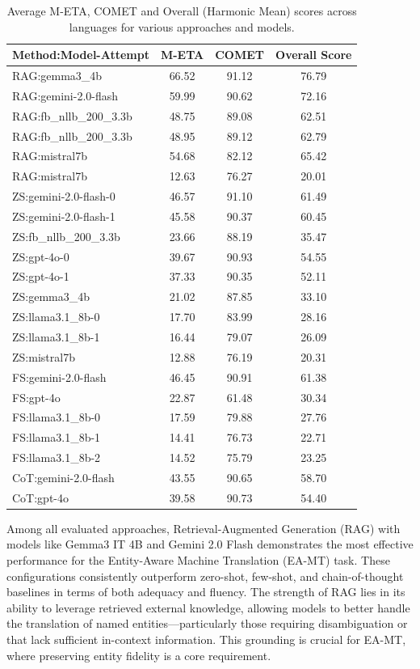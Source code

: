 \documentclass{ecai}
\begin{document}
\begin{table}[h!]
\centering
\small %
\label{tab:combined_methods_avg_scores}
\begin{tabular}{|l|c|c|c|}
\hline
\textbf{Method:Model-Attempt} & \textbf{M-ETA} & \textbf{COMET} & \textbf{Overall Score} \\
\hline
RAG:gemma3\_4b & 66.52 & 91.12 & 76.79 \\
RAG:gemini-2.0-flash & 59.99 & 90.62 & 72.16 \\
RAG:fb\_nllb\_200\_3.3b & 48.75 & 89.08 & 62.51 \\
RAG:fb\_nllb\_200\_3.3b & 48.95 & 89.12 & 62.79 \\
RAG:mistral7b & 54.68 & 82.12 & 65.42 \\
RAG:mistral7b & 12.63 & 76.27 & 20.01 \\
\hline
ZS:gemini-2.0-flash-0 & 46.57 & 91.10 & 61.49 \\
ZS:gemini-2.0-flash-1 & 45.58 & 90.37 & 60.45 \\
ZS:fb\_nllb\_200\_3.3b & 23.66 & 88.19 & 35.47 \\
ZS:gpt-4o-0 & 39.67 & 90.93 & 54.55 \\
ZS:gpt-4o-1 & 37.33 & 90.35 & 52.11 \\
ZS:gemma3\_4b & 21.02 & 87.85 & 33.10 \\
ZS:llama3.1\_8b-0 & 17.70 & 83.99 & 28.16 \\
ZS:llama3.1\_8b-1 & 16.44 & 79.07 & 26.09 \\
ZS:mistral7b & 12.88 & 76.19 & 20.31 \\
\hline
FS:gemini-2.0-flash & 46.45 & 90.91 & 61.38 \\
FS:gpt-4o & 22.87 & 61.48 & 30.34 \\
FS:llama3.1\_8b-0 & 17.59 & 79.88 & 27.76 \\
FS:llama3.1\_8b-1 & 14.41 & 76.73 & 22.71 \\
FS:llama3.1\_8b-2 & 14.52 & 75.79 & 23.25 \\
\hline
CoT:gemini-2.0-flash & 43.55 & 90.65 & 58.70 \\
CoT:gpt-4o & 39.58 & 90.73 & 54.40 \\
\hline
\end{tabular}
\caption{Average M-ETA, COMET and Overall (Harmonic Mean) scores across languages for various approaches and models.}
\end{table}

Among all evaluated approaches, Retrieval-Augmented Generation (RAG) with models like Gemma3 IT 4B 
and Gemini 2.0 Flash demonstrates the most effective performance for the Entity-Aware Machine Translation (EA-MT) task. 
These configurations consistently outperform zero-shot, few-shot, and chain-of-thought baselines in terms of both adequacy
and fluency. The strength of RAG lies in its ability to leverage retrieved external knowledge, allowing models to 
better handle the translation of named entities—particularly those requiring disambiguation or that lack sufficient 
in-context information. This grounding is crucial for EA-MT, where preserving entity fidelity is a core requirement.
\end{document}
